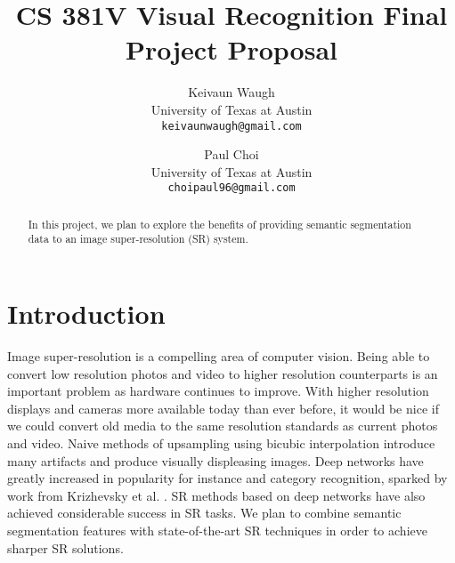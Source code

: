 \documentclass[10pt,twocolumn,letterpaper]{article}
\begin{document}
\title{CS 381V Visual Recognition Final Project Proposal}

\author{Keivaun Waugh\\
University of Texas at Austin\\
{\tt\small keivaunwaugh@gmail.com}
\and
Paul Choi\\
University of Texas at Austin\\
{\tt\small choipaul96@gmail.com}
}

\maketitle

\begin{abstract}
In this project, we plan to explore the benefits of providing semantic
segmentation data to an image super-resolution (SR) system.
\end{abstract}

\section{Introduction}
Image super-resolution is a compelling area of computer vision. Being able to
convert low resolution photos and video to higher resolution counterparts is an
important problem as hardware continues to improve. With higher resolution
displays and cameras more available today than ever before, it would be nice if
we could convert old media to the same resolution standards as current photos
and video. Naive methods of upsampling using bicubic interpolation introduce
many artifacts and produce visually displeasing images. Deep networks have
greatly increased in popularity for instance and category recognition, sparked
by work from Krizhevsky et al. \cite{AlexNet}. SR methods based on deep networks
have also achieved considerable success in SR tasks. We plan to combine
semantic segmentation features with state-of-the-art SR techniques in order to
achieve sharper SR solutions.

\end{document}
